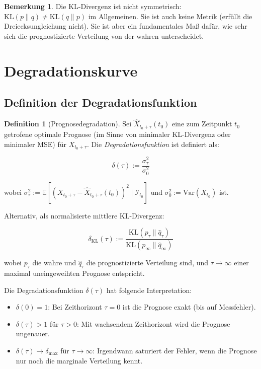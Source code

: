 \documentclass[a4paper, 12pt, twoside, openright]{report}
\theoremstyle{definition}
\newtheorem{definition}[theorem]{Definition}
\newtheorem{remark}[theorem]{Bemerkung}
\theoremstyle{definition}
\newcommand{\E}{\mathbb{E}}
\newcommand{\Var}{\mathrm{Var}}
\newcommand{\KL}{\mathrm{KL}}
\begin{document}
\begin{remark}
Die KL-Divergenz ist nicht symmetrisch: $\KL(p \parallel q) \neq \KL(q \parallel p)$ im Allgemeinen. Sie ist auch keine Metrik (erfüllt die Dreiecksungleichung nicht). Sie ist aber ein fundamentales Maß dafür, wie sehr sich die prognostizierte Verteilung von der wahren unterscheidet.
\end{remark}

\section{Degradationskurve}
\label{sec:degradation}

\subsection{Definition der Degradationsfunktion}

\begin{definition}[Prognosedegradation]
Sei $\hat{X}_{t_0+\tau}(t_0)$ eine zum Zeitpunkt $t_0$ getrofene optimale Prognose (im Sinne von minimaler KL-Divergenz oder minimaler MSE) für $X_{t_0+\tau}$. Die \emph{Degradationsfunktion} ist definiert als:

\begin{equation}
\delta(\tau) := \frac{\sigma_\tau^2}{\sigma_0^2}
\label{eq:degradation}
\end{equation}

wobei $\sigma_\tau^2 := \E[(X_{t_0+\tau} - \hat{X}_{t_0+\tau}(t_0))^2 \mid \mathcal{I}_{t_0}]$ und $\sigma_0^2 := \Var(X_{t_0})$ ist.

Alternativ, als normalisierte mittlere KL-Divergenz:

\begin{equation}
\delta_{\KL}(\tau) := \frac{\KL(p_\tau \parallel \hat{q}_\tau)}{\KL(p_\infty \parallel \hat{q}_\infty)}
\label{eq:degradation_kl}
\end{equation}

wobei $p_\tau$ die wahre und $\hat{q}_\tau$ die prognostizierte Verteilung sind, und $\tau \to \infty$ einer maximal uneingeweihten Prognose entspricht.
\end{definition}

Die Degradationsfunktion $\delta(\tau)$ hat folgende Interpretation:
\begin{itemize}
  \item $\delta(0) = 1$: Bei Zeithorizont $\tau=0$ ist die Prognose exakt (bis auf Messfehler).
  \item $\delta(\tau) > 1$ für $\tau > 0$: Mit wachsendem Zeithorizont wird die Prognose ungenauer.
  \item $\delta(\tau) \to \delta_{\max}$ für $\tau \to \infty$: Irgendwann saturiert der Fehler, wenn die Prognose nur noch die marginale Verteilung kennt.
\end{itemize}
\end{document}

